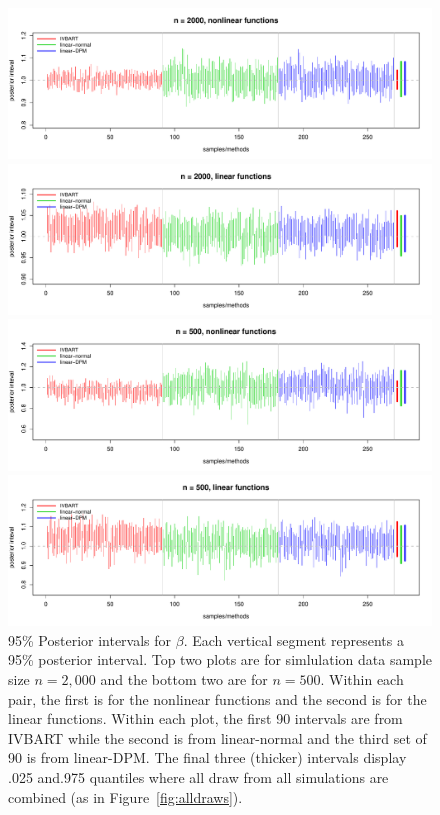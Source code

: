\begin{figure}
\centerline{\includegraphics[scale=.35]{14-11_1-2_2000_intervals.pdf}} 
\centerline{\includegraphics[scale=.35]{14-31_1-2_2000_intervals.pdf}} 
\centerline{\includegraphics[scale=.35]{14-11_1-2_500_intervals.pdf}}  
\centerline{\includegraphics[scale=.35]{14-31_1-2_500_intervals.pdf}}
\caption{%
95\% Posterior intervals for $\beta$.
Each vertical segment represents a 95\% posterior interval.
Top two plots are for simlulation data sample size $n=2,000$ and the bottom two are for $n=500$.
Within each pair, the first is for the nonlinear functions and the second is for the linear functions.
Within each plot, the first 90 intervals are from IVBART while the second is from linear-normal and the third set of 90 is from linear-DPM.
The final three (thicker) intervals display .025 and.975 quantiles where all draw from all simulations are combined (as in Figure~\ref{fig:alldraws}).
\label{fig:sim-ints}}
\end{figure}

